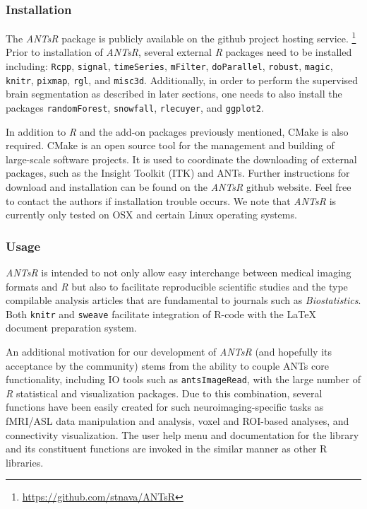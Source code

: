\subsubsection{Installation}

The \textit{ANTsR} package is publicly available on the github project hosting service.%
\footnote{
\href{https://github.com/stnava/ANTsR}{https://github.com/stnava/ANTsR}
}
Prior to installation of \textit{ANTsR}, several external \textit{R} packages
need to be installed including: \verb#Rcpp#, \verb#signal#, \verb#timeSeries#, 
\verb#mFilter#, \verb#doParallel#, \verb#robust#, \verb#magic#, \verb#knitr#, \verb#pixmap#, 
\verb#rgl#, and \verb#misc3d#.
Additionally, in order
to perform the supervised brain segmentation as described 
in later sections, one needs to also install the packages
\verb#randomForest#, \verb#snowfall#, \verb#rlecuyer#,
and \verb#ggplot2#.

In addition to \textit{R} and the add-on packages previously mentioned, CMake is also 
required.  CMake
is an open source tool for the management and building of 
large-scale software projects.  It is used
to coordinate the downloading of external packages,
such as the Insight Toolkit (ITK)
and ANTs.  Further instructions for download and
installation can be found on the \textit{ANTsR} github website.  Feel
free to contact the authors if installation trouble occurs.  We note
that \textit{ANTsR} is currently only tested on OSX and certain Linux
operating systems.

\subsubsection{Usage}
\textit{ANTsR} is intended to not only allow easy interchange between
medical imaging formats and \textit{R} but also to facilitate
reproducible scientific studies and the type compilable analysis
articles that are fundamental to journals such as
\textit{Biostatistics}.  Both \verb#knitr# and \verb#sweave#
facilitate integration of R-code with the LaTeX document
preparation system.  

An additional motivation for our development of \textit{ANTsR} (and
hopefully its acceptance by the community) 
stems from the ability to couple ANTs core 
functionality, including IO tools such as \verb#antsImageRead#, 
with the large number of \textit{R} statistical and
visualization packages.  Due to this combination, several
functions have been easily created for such neuroimaging-specific 
tasks as fMRI/ASL data manipulation and analysis,
voxel and ROI-based  analyses,
and connectivity visualization. %
The user help menu and documentation for the library  and its
constituent functions are invoked in the similar manner as other
R libraries.


